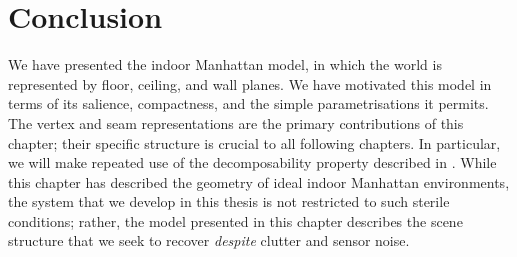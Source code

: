 \section{Conclusion}

We have presented the indoor Manhattan model, in which the world is
represented by floor, ceiling, and wall planes. We have motivated this
model in terms of its salience, compactness, and the simple
parametrisations it permits. The vertex and seam representations are
the primary contributions of this chapter; their specific structure is
crucial to all following chapters. In particular, we will make
repeated use of the decomposability property described in
. While this chapter has described the
geometry of ideal indoor Manhattan environments, the system that we
develop in this thesis is not restricted to such sterile conditions;
rather, the model presented in this chapter describes the scene
structure that we seek to recover \textit{despite} clutter and sensor
noise.
